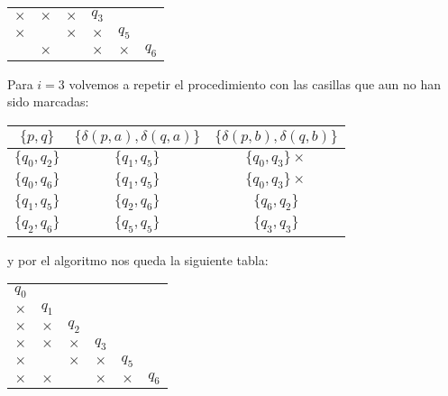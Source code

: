 \begin{itemize}
\begin{center}
\begin{tabular}{ cccccc}
        \multicolumn{1}{|c|}{$\times$} &\multicolumn{1}{|c|}{$\times$} &\multicolumn{1}{|c|}{$\times$} &$q_3$ & & \\ \cline{1-4}
        \multicolumn{1}{|c|}{$\times$} &\multicolumn{1}{|c|}{} &\multicolumn{1}{|c|}{$\times$} &\multicolumn{1}{|c|}{$\times$} &$q_5$ & \\ \cline{1-5}
        \multicolumn{1}{|c|}{} &\multicolumn{1}{|c|}{$\times$} &\multicolumn{1}{|c|}{} &\multicolumn{1}{|c|}{$\times$} &\multicolumn{1}{|c|}{$\times$} &$q_6$ \\ \cline{1-5}
    \end{tabular}
    \end{center}
    Para $i=3$ volvemos a repetir el procedimiento con las casillas que aun no han sido marcadas:
    \begin{center}
        \begin{tabular}{c||c|c}
        $\{p,q\}$ & $\{\delta(p,a),\delta(q,a)\}$ & $\{\delta(p,b),\delta(q,b)\}$ \\ \hline
        $\{q_0,q_2\}$ & $\{q_1,q_5\}$ & $\{q_0,q_3\}\times$ \\ \hline
        $\{q_0,q_6\}$ & $\{q_1,q_5\}$ & $\{q_0,q_3\}\times$ \\ \hline
        $\{q_1,q_5\}$ & $\{q_2,q_6\}$ & $\{q_6,q_2\}$ \\ \hline
        $\{q_2,q_6\}$ & $\{q_5,q_5\}$  & $\{q_3,q_3\}$ \\ \hline  
        \end{tabular}
    \end{center}
    y por el algoritmo nos queda la siguiente tabla:
    \begin{center}
        \begin{tabular}{ cccccc}
        $q_0$& & & & & \\ \cline{1-1}
        \multicolumn{1}{|c|}{$\times$} &$q_1$ & & & & \\ \cline{1-2}
        \multicolumn{1}{|c|}{$\times$} &\multicolumn{1}{|c|}{$\times$} &$q_2$ & & & \\ \cline{1-3}
        \multicolumn{1}{|c|}{$\times$} &\multicolumn{1}{|c|}{$\times$} &\multicolumn{1}{|c|}{$\times$} &$q_3$ & & \\ \cline{1-4}
        \multicolumn{1}{|c|}{$\times$} &\multicolumn{1}{|c|}{} &\multicolumn{1}{|c|}{$\times$} &\multicolumn{1}{|c|}{$\times$} &$q_5$ & \\ \cline{1-5}
        \multicolumn{1}{|c|}{$\times$} &\multicolumn{1}{|c|}{$\times$} &\multicolumn{1}{|c|}{} &\multicolumn{1}{|c|}{$\times$} &\multicolumn{1}{|c|}{$\times$} &$q_6$ \\ \cline{1-5}

\end{tabular}
\end{center}
\end{itemize}

